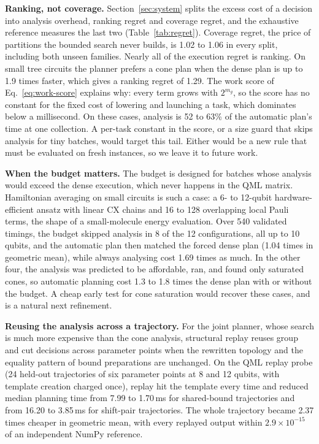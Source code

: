 \textbf{Ranking, not coverage.} Section~\ref{sec:system} splits the excess cost of a decision into analysis overhead, ranking regret and coverage regret, and the exhaustive reference measures the last two (Table~\ref{tab:regret}). Coverage regret, the price of partitions the bounded search never builds, is 1.02 to 1.06 in every split, including both unseen families. Nearly all of the execution regret is ranking. On small tree circuits the planner prefers a cone plan when the dense plan is up to 1.9 times faster, which gives a ranking regret of 1.29. The work score of Eq.~\eqref{eq:work-score} explains why: every term grows with $2^{m_g}$, so the score has no constant for the fixed cost of lowering and launching a task, which dominates below a millisecond. On these cases, analysis is 52 to 63\% of the automatic plan's time at one collection. A per-task constant in the score, or a size guard that skips analysis for tiny batches, would target this tail. Either would be a new rule that must be evaluated on fresh instances, so we leave it to future work.

\textbf{When the budget matters.} The budget is designed for batches whose analysis would exceed the dense execution, which never happens in the QML matrix. Hamiltonian averaging on small circuits is such a case: a 6- to 12-qubit hardware-efficient ansatz with linear CX chains and 16 to 128 overlapping local Pauli terms, the shape of a small-molecule energy evaluation. Over 540 validated timings, the budget skipped analysis in 8 of the 12 configurations, all up to 10 qubits, and the automatic plan then matched the forced dense plan (1.04 times in geometric mean), while always analysing cost 1.69 times as much. In the other four, the analysis was predicted to be affordable, ran, and found only saturated cones, so automatic planning cost 1.3 to 1.8 times the dense plan with or without the budget. A cheap early test for cone saturation would recover these cases, and is a natural next refinement.

\textbf{Reusing the analysis across a trajectory.} For the joint planner, whose search is much more expensive than the cone analysis, structural replay reuses group and cut decisions across parameter points when the rewritten topology and the equality pattern of bound preparations are unchanged. On the QML replay probe (24 held-out trajectories of six parameter points at 8 and 12 qubits, with template creation charged once), replay hit the template every time and reduced median planning time from 7.99 to 1.70\,ms for shared-bound trajectories and from 16.20 to 3.85\,ms for shift-pair trajectories. The whole trajectory became 2.37 times cheaper in geometric mean, with every replayed output within $2.9\times10^{-15}$ of an independent NumPy reference.
